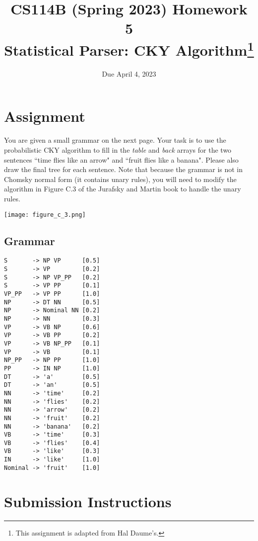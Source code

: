 \documentclass[11pt,letterpaper]{article}
\begin{document}
\title{CS114B (Spring 2023) Homework 5\\Statistical Parser: CKY Algorithm\thanks{This assignment is adapted from Hal Daume's.}}
\author{Due April 4, 2023}
\date{}
\maketitle

\section*{Assignment}

You are given a small grammar on the next page. Your task is to use the probabilistic CKY algorithm to fill in the \textit{table} and \textit{back} arrays for the two sentences ``time flies like an arrow" and ``fruit flies like a banana". Please also draw the final tree for each sentence. Note that because the grammar is not in Chomsky normal form (it contains unary rules), you will need to modify the algorithm in Figure C.3 of the Jurafsky and Martin book to handle the unary rules.

\noindent\texttt{[image: figure\_c\_3.png]}

\subsection*{Grammar}

\begin{verbatim}
S       -> NP VP      [0.5]
S       -> VP         [0.2]
S       -> NP VP_PP   [0.2]
S       -> VP PP      [0.1]
VP_PP   -> VP PP      [1.0]
NP      -> DT NN      [0.5]
NP      -> Nominal NN [0.2]
NP      -> NN         [0.3]
VP      -> VB NP      [0.6]
VP      -> VB PP      [0.2]
VP      -> VB NP_PP   [0.1]
VP      -> VB         [0.1]
NP_PP   -> NP PP      [1.0]
PP      -> IN NP      [1.0]
DT      -> 'a'        [0.5]
DT      -> 'an'       [0.5]
NN      -> 'time'     [0.2]
NN      -> 'flies'    [0.2]
NN      -> 'arrow'    [0.2]
NN      -> 'fruit'    [0.2]
NN      -> 'banana'   [0.2]
VB      -> 'time'     [0.3]
VB      -> 'flies'    [0.4]
VB      -> 'like'     [0.3]
IN      -> 'like'     [1.0]
Nominal -> 'fruit'    [1.0]
\end{verbatim}\newpage

\section*{Submission Instructions}
\end{document}
